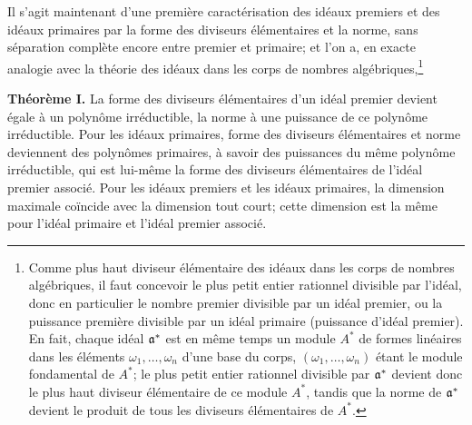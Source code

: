 Il s'agit maintenant d'une première caractérisation des idéaux premiers et des idéaux primaires par la forme des diviseurs élémentaires et la norme, sans séparation complète encore entre premier et primaire; et l'on a, en exacte analogie avec la théorie des idéaux dans les corps de nombres algébriques,\footnote{Comme plus haut diviseur élémentaire des idéaux dans les corps de nombres algébriques, il faut concevoir le plus petit entier rationnel divisible par l'idéal, donc en particulier le nombre premier divisible par un idéal premier, ou la puissance première divisible par un idéal primaire (puissance d'idéal premier). En fait, chaque idéal $\mathfrak a^*$ est en même temps un module $A^*$ de formes linéaires dans les éléments $\omega_1,\ldots,\omega_n$ d'une base du corps, $(\omega_1,\ldots,\omega_n)$ étant le module fondamental de $A^*$; le plus petit entier rationnel divisible par $\mathfrak a^*$ devient donc le plus haut diviseur élémentaire de ce module $A^*$, tandis que la norme de $\mathfrak a^*$ devient le produit de tous les diviseurs élémentaires de $A^*$.}

\textbf{Théorème I.} La forme des diviseurs élémentaires d'un idéal premier devient égale à un polynôme irréductible, la norme à une puissance de ce polynôme irréductible. Pour les idéaux primaires, forme des diviseurs élémentaires et norme deviennent des polynômes primaires, à savoir des puissances du même polynôme irréductible, qui est lui-même la forme des diviseurs élémentaires de l'idéal premier associé. Pour les idéaux premiers et les idéaux primaires, la dimension maximale coïncide avec la dimension tout court; cette dimension est la même pour l'idéal primaire et l'idéal premier associé.

